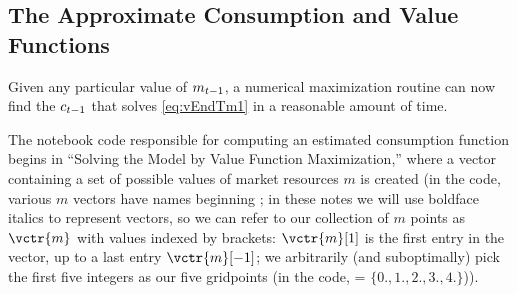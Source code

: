 \documentclass[SolvingMicroDSOPs]{subfiles}
\begin{document}
\hypertarget{the-approximate-consumption-and-value-functions}{}
\subsection{The Approximate Consumption and Value Functions}

Given any particular value of ${m}_{t-1}$, a numerical maximization routine can now find the ${c}_{t-1}$ that solves \eqref{eq:vEndTm1} in a reasonable amount of time.

\begin{comment}

\end{comment}

The notebook code responsible for computing an estimated consumption function begins in ``Solving the Model by Value Function Maximization,'' where a vector containing a set of possible values of market resources ${m}$ is created (in the code, various $m$ vectors have names beginning {\mVec}; in these notes we will use boldface italics to represent vectors, so we can refer to our collection of ${m}$ points as $\vctr{m}$ with values indexed by brackets: $\vctr{m}[1]$ is the first entry in the vector, up to a last entry $\vctr{m}[-1]$; we arbitrarily (and suboptimally) pick the first five integers as our five {\mVec}  gridpoints (in the code, = $\{0.,1.,2.,3.,4.\}$)).

\end{document}
